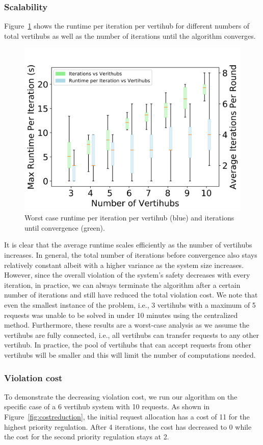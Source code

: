 \subsubsection{Scalability}
Figure~\ref{fig:runtime} shows the runtime per iteration per vertihub for different numbers of total vertihubs as well as the number of iterations until the algorithm converges. 
\begin{figure}[h!]
    \centering
    \includegraphics[width=0.8\columnwidth]{UAM-NFM/Figures/max_runtime_vs_size_boxplot_requests_static_with_iterations.png}
    \caption{Worst case runtime per iteration per vertihub (blue) and iterations until convergence (green).}
\label{fig:runtime}
\end{figure}
It is clear that the average runtime scales efficiently as the number of vertihubs increases.  In general, the total number of iterations before convergence also stays relatively constant albeit with a higher variance as the system size increases.  However, since the overall violation of the system's safety decreases with every iteration, in practice, we can always terminate the algorithm after a certain number of iterations and still have reduced the total violation cost. We note that even the smallest instance of the problem, i.e., 3 vertihubs with a maximum of 5 requests was unable to be solved in under 10 minutes using the centralized method. Furthermore, these results are a worst-case analysis as we assume the vertihubs are fully connected, i.e., all vertihubs can transfer requests to any other vertihub. In practice, the pool of vertihubs that can accept requests from other vertihubs will be smaller and this will limit the number of computations needed. 

\subsubsection{Violation cost}
To demonstrate the decreasing violation cost, we run our algorithm on the specific case of a 6 vertihub system with 10 requests. As shown in Figure~\ref{fig:costreduction}, the initial request allocation has a cost of 11 for the highest priority regulation. After 4 iterations, the cost has decreased to 0 while the cost for the second priority regulation stays at 2. 

